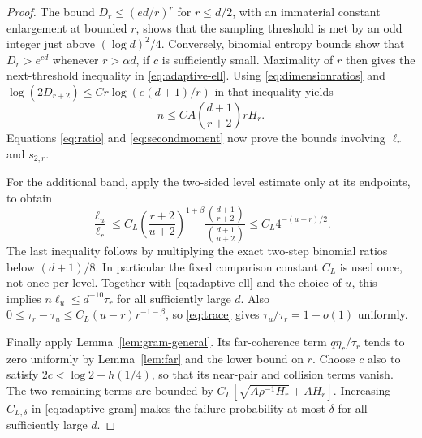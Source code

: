 \begin{proof}
The bound $D_r\le (ed/r)^r$ for $r\le d/2$, with an immaterial
constant enlargement at bounded $r$, shows that the sampling threshold
is met by an odd integer just above $(\log d)^2/4$.
Conversely, binomial entropy bounds show that $D_r>e^{cd}$ whenever
$r>\alpha d$, if $c$ is sufficiently small. Maximality of $r$ then
gives the next-threshold inequality in \eqref{eq:adaptive-ell}.
Using \eqref{eq:dimensionratios} and
$\log(2D_{r+2})\le C r\log(e(d+1)/r)$ in that inequality yields
\[
 n\le C A\binom{d+1}{r+2}rH_r.
\]
Equations \eqref{eq:ratio} and \eqref{eq:secondmoment} now prove
the bounds involving $\ell_r$ and $s_{2,r}$.

For the additional band, apply the two-sided level estimate only at
its endpoints, to obtain
\[
 \frac{\ell_u}{\ell_r}
 \le C_L\left(\frac{r+2}{u+2}\right)^{1+\beta}
      \frac{\binom{d+1}{r+2}}{\binom{d+1}{u+2}}
 \le C_L4^{-(u-r)/2}.
\]
The last inequality follows by multiplying the exact two-step
binomial ratios below $(d+1)/8$. In particular the fixed comparison
constant $C_L$ is used once, not once per level.
Together with \eqref{eq:adaptive-ell} and the choice of $u$, this
implies $n\ell_u\le d^{-10}\tau_r$ for all sufficiently large $d$.
Also
$0\le\tau_r-\tau_u\le C_L(u-r)r^{-1-\beta}$,
so \eqref{eq:trace} gives $\tau_u/\tau_r=1+o(1)$ uniformly.

Finally apply Lemma~\ref{lem:gram-general}. Its far-coherence term
$q\eta_r/\tau_r$ tends to zero uniformly by
Lemma~\ref{lem:far} and the lower bound on $r$.
Choose $c$ also to satisfy
$2c<\log2-h(1/4)$, so that its near-pair and collision terms vanish.
The two remaining terms are bounded by
$C_L[\sqrt{A\rho^{-1}H_r}+A H_r]$.
Increasing $C_{L,\delta}$ in \eqref{eq:adaptive-gram} makes the
failure probability at most $\delta$ for all sufficiently large $d$.
\end{proof}
